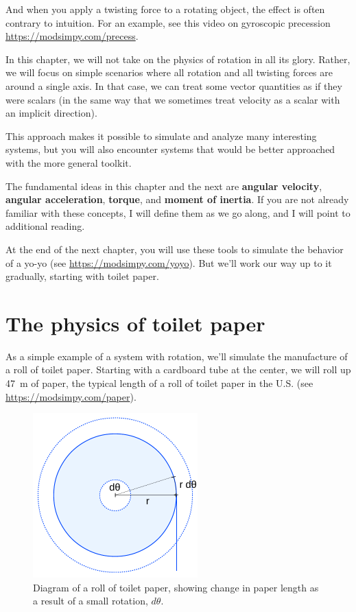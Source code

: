 \documentclass[12pt]{book}
\theoremstyle{exercise}
\begin{document}
And when you apply a twisting force to a rotating object, the effect is often contrary to intuition.  For an example, see this video on gyroscopic precession \url{https://modsimpy.com/precess}.


In this chapter, we will not take on the physics of rotation in all its glory.  Rather, we will focus on simple scenarios where all rotation and all twisting forces are around a single axis.  In that case, we can treat some vector quantities as if they were scalars (in the same way that we sometimes treat velocity as a scalar with an implicit direction).


This approach makes it possible to simulate and analyze many interesting systems, but you will also encounter systems that would be better approached with the more general toolkit.

The fundamental ideas in this chapter and the next are {\bf angular velocity}, {\bf angular acceleration}, {\bf torque}, and {\bf moment of inertia}.  If you are not already familiar with these concepts, I will define them as we go along, and I will point to additional reading.

At the end of the next chapter, you will use these tools to simulate the behavior of a yo-yo (see \url{https://modsimpy.com/yoyo}).  But we'll work our way up to it gradually, starting with toilet paper.



\section{The physics of toilet paper}
\label{paper}

As a simple example of a system with rotation, we'll simulate the manufacture of a roll of toilet paper.  Starting with a cardboard tube at the center, we will roll up \SI{47}{\meter} of paper, the typical length of a roll of toilet paper in the U.S. (see \url{https://modsimpy.com/paper}).


\begin{figure}
\centerline{\includegraphics[height=2.5in]{figs/paper_roll.pdf}}
\caption{Diagram of a roll of toilet paper, showing change in paper length as a result of a small rotation, $d\theta$.}
\label{paper_roll}
\end{figure}
\end{document}

